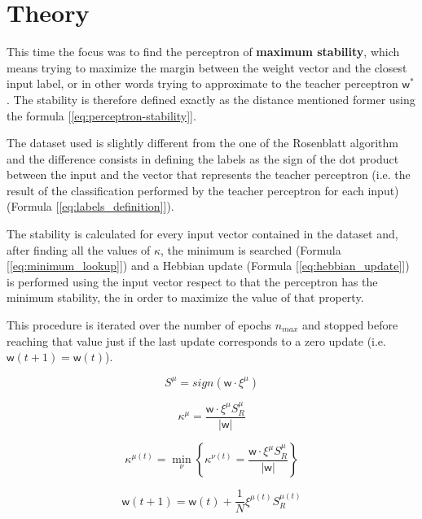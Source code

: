 \section{Theory}
\label{sec:theory}

This time the focus was to find the perceptron of \textbf{maximum stability}, which means trying to maximize the margin between the
weight vector and the closest input label, or in other words trying to approximate to the teacher perceptron $\bm{\mathsf{w}}^*$.
The stability is therefore defined exactly as the distance mentioned former using the formula [\ref{eq:perceptron-stability}].

The dataset used is slightly different from the one of the Rosenblatt algorithm and the difference consists in defining the labels
as the sign of the dot product between the input and the vector that represents the teacher perceptron (i.e. the result of the
classification performed by the teacher perceptron for each input) (Formula [\ref{eq:labels_definition}]). 

The stability is calculated for every input vector contained in the dataset and, after finding all the values of $\kappa$,
the minimum is searched (Formula [\ref{eq:minimum_lookup}]) and a Hebbian update (Formula [\ref{eq:hebbian_update}]) is performed using the input vector
respect to that the perceptron has the minimum stability, the in order to maximize the value of that property.

This procedure is iterated over the number of epochs $n_{max}$ and stopped before reaching that value just if the last update
corresponds to a zero update (i.e. $\bm{\mathsf{w}}(t+1) = \bm{\mathsf{w}}(t)$). 

\begin{equation} \label{eq:labels_definition}
    S^\mu = sign(\bm{\mathsf{w}} \cdotp \xi^\mu)
\end{equation}

\begin{equation} \label{eq:perceptron-stability}
    \kappa^\mu = \frac{\bm{\mathsf{w}} \cdotp \xi^\mu S^\mu_R}{\lvert \bm{\mathsf{w}} \rvert}
\end{equation}

\begin{equation} \label{eq:minimum_lookup}
    \kappa^{\mu(t)} = \min_\nu \left \{ \kappa^{\nu(t)} =  \frac{\bm{\mathsf{w}} \cdotp \xi^\mu S^\mu_R}{\lvert \bm{\mathsf{w}} \rvert} \right \}
\end{equation}

\begin{equation} \label{eq:hebbian_update}
    \bm{\mathsf{w}}(t+1) = \bm{\mathsf{w}}(t) + \frac{1}{N} \xi^{\mu(t)} S^{\mu(t)}_R
\end{equation}